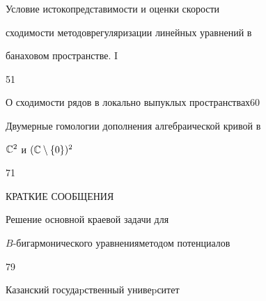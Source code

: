 

{Условие истокопредставимости и оценки скорости 


сходимости методов\newline регуляризации линейных уравнений в 


банаховом пространстве. I}{51}




{О сходимости рядов в локально выпуклых пространствах}{60}




{Двумерные гомологии дополнения алгебраической кривой в


$\Bbb C^2$ и $(\Bbb C\setminus \{0\})^2$}{71}








\bigskip





\bigskip


\par


\centerline{КРАТКИЕ СООБЩЕНИЯ}


\bigskip







{Решение основной краевой задачи для 


$B$-бигармонического уравнения\newline методом потенциалов}{79}











\vfill


\noindent\raisebox{2pt}{\copyright} Казанский госудаpственный унивеpситет





